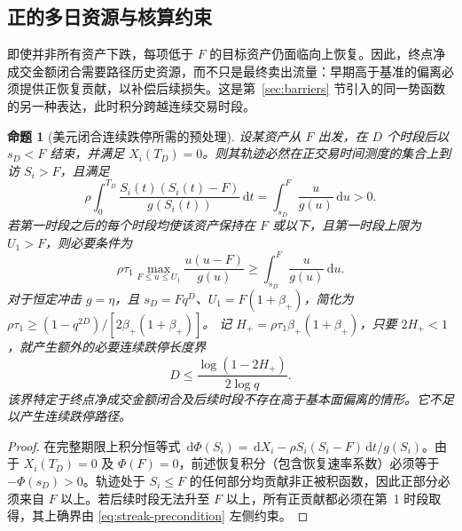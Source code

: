 \documentclass[11pt]{article}
\numberwithin{equation}{section}
\newtheorem{proposition}[theorem]{命题}
\theoremstyle{definition}
\theoremstyle{remark}
\newcommand{\dd}{\,\mathrm{d}}
\begin{document}
\subsection{正的多日资源与核算约束}\label{subsec:multiday-preconditioning}
即使并非所有资产下跌，每项低于 $F$ 的目标资产仍面临向上恢复。因此，终点净成交金额闭合需要路径历史资源，而不只是最终卖出流量：早期高于基准的偏离必须提供正恢复贡献，以补偿后续损失。这是第~\ref{sec:barriers} 节引入的同一势函数的另一种表达，此时积分跨越连续交易时段。
\begin{proposition}[美元闭合连续跌停所需的预处理]\label{prop:streak-precondition}
设某资产从 $F$ 出发，在 $D$ 个时段后以 $s_D<F$ 结束，并满足 $X_i(T_D)=0$。则其轨迹必然在正交易时间测度的集合上到访 $S_i>F$，且满足
\begin{equation}\label{eq:streak-excursion}
 \rho\int_0^{T_D}\frac{S_i(t)(S_i(t)-F)}{g(S_i(t))}\dd t
 =\int_{s_D}^{F}\frac{u}{g(u)}\dd u>0.
\end{equation}
若第一时段之后的每个时段均使该资产保持在 $F$ 或以下，且第一时段上限为 $U_1>F$，则必要条件为
\begin{equation}\label{eq:streak-precondition}
 \boxed{\quad \rho\tau_1\max_{F\le u\le U_1}\frac{u(u-F)}{g(u)}
 \ge \int_{s_D}^{F}\frac{u}{g(u)}\dd u.\quad}
\end{equation}
对于恒定冲击 $g=\eta$，且 $s_D=Fq^D$、$U_1=F(1+\beta_+)$，简化为
$\rho\tau_1\ge(1-q^{2D})/[2\beta_+(1+\beta_+)]$。
记 $H_+=\rho\tau_1\beta_+(1+\beta_+)$，只要 $2H_+<1$，就产生额外的必要连续跌停长度界
\begin{equation}\label{eq:multiday-preconditioning-D}
\boxed{\quad D\le \frac{\log(1-2H_+)}{2\log q}.\quad}
\end{equation}
该界特定于终点净成交金额闭合及后续时段不存在高于基本面偏离的情形。它不足以产生连续跌停路径。
\end{proposition}
\begin{proof}
在完整期限上积分恒等式 $\dd\Phi(S_i)=\dd X_i-\rho S_i(S_i-F)\dd t/g(S_i)$。由于 $X_i(T_D)=0$ 及 $\Phi(F)=0$，前述恢复积分（包含恢复速率系数）必须等于 $-\Phi(s_D)>0$。轨迹处于 $S_i\le F$ 的任何部分均贡献非正被积函数，因此正部分必须来自 $F$ 以上。若后续时段无法升至 $F$ 以上，所有正贡献都必须在第~1 时段取得，其上确界由 \eqref{eq:streak-precondition} 左侧约束。
\end{proof}
\end{document}
